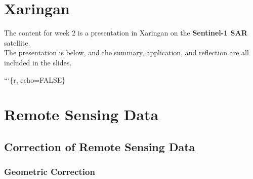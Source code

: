 \documentclass[
  letterpaper,
]{scrbook}
\begin{document}

\chapter{Xaringan}\label{xaringan}

The content for week 2 is a presentation in Xaringan on the
\textbf{Sentinel-1 SAR} satellite.\\
The presentation is below, and the summary, application, and reflection
are all included in the slides.

```\{r, echo=FALSE\}


\chapter{Remote Sensing Data}\label{remote-sensing-data}

\section{Correction of Remote Sensing
Data}\label{correction-of-remote-sensing-data}

\subsection{Geometric Correction}\label{geometric-correction}
\end{document}
